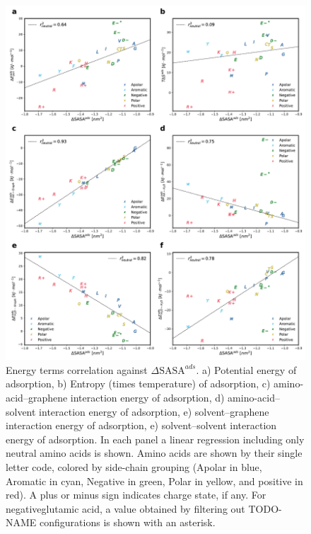 \documentclass[9pt]{article}
\begin{document}
\begin{figure}[hbtp]
    \centering
    \includegraphics[width=.9\textwidth]{FigS9}
    \caption{ Energy terms correlation against $\Delta \textrm{SASA}^{ads}$. a) Potential energy of adsorption, b) Entropy (times temperature) of adsorption, c) amino-acid--graphene interaction energy of adsorption, d) amino-acid--solvent interaction energy of adsorption, e) solvent--graphene interaction energy of adsorption, e) solvent--solvent interaction energy of adsorption. In each panel a linear regression including only neutral amino acids is shown. Amino acids are shown by their single letter code, colored by side-chain grouping (Apolar in blue, Aromatic in cyan, Negative in green, Polar in yellow, and positive in red). A plus or minus sign indicates charge state, if any. For negativeglutamic acid, a value obtained by filtering out TODO-NAME configurations is shown with an asterisk.}
    \label{fig:Correlations}
\end{figure}
\end{document}
